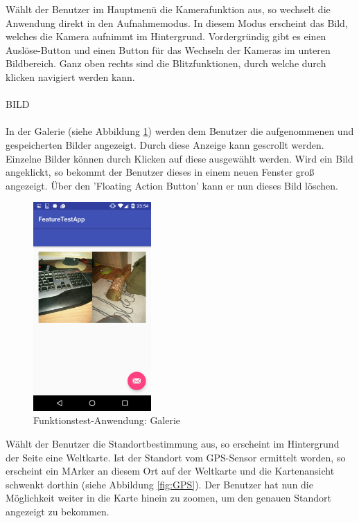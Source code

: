 Wählt der Benutzer im Hauptmenü die Kamerafunktion aus, so wechselt die Anwendung direkt in den Aufnahmemodus. In diesem Modus erscheint das Bild, welches die Kamera aufnimmt im Hintergrund. Vordergründig gibt es einen Auslöse-Button und einen Button für das Wechseln der Kameras im unteren Bildbereich. Ganz oben rechts sind die Blitzfunktionen, durch welche durch klicken navigiert werden kann. 
\\
\\
BILD
\\
\\
In der Galerie (siehe Abbildung \ref{fig:Gallery}) werden dem Benutzer die aufgenommenen und gespeicherten Bilder angezeigt. Durch diese Anzeige kann gescrollt werden. Einzelne Bilder können durch Klicken auf diese ausgewählt werden. Wird ein Bild angeklickt, so bekommt der Benutzer dieses in einem neuen Fenster groß angezeigt. Über den 'Floating Action Button' kann er nun dieses Bild löschen. 

\begin{figure}[h]
	\centering
	\includegraphics[width=0.4\textwidth]{Bilder/Screenshots/Screenshot_20170214-235454.PNG}
	\caption{Funktionstest-Anwendung: Galerie}
	\label{fig:Gallery}
\end{figure}

Wählt der Benutzer die Standortbestimmung aus, so erscheint im Hintergrund der Seite eine Weltkarte. Ist der Standort vom GPS-Sensor ermittelt worden, so erscheint ein MArker an diesem Ort auf der Weltkarte und die Kartenansicht schwenkt dorthin (siehe Abbildung \ref{fig:GPS}). Der Benutzer hat nun die Möglichkeit weiter in die Karte hinein zu zoomen, um den genauen Standort angezeigt zu bekommen. 
\clearpage

